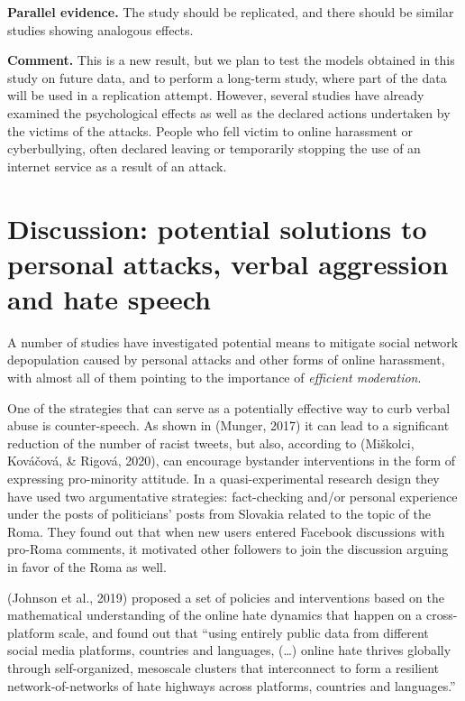 \documentclass[10pt,dvipsnames]{scrartcl}
\begin{document}
\begin{description}
\item \textbf{Parallel evidence.} The study should be replicated, and there should be similar studies showing analogous effects. 


\textbf{Comment.} This is a new result, but we plan to test the models obtained in this study on future data, and to perform a long-term study, where part of the data will be used in a replication attempt. However, several studies have already examined the psychological effects as well as the declared actions undertaken by the victims of the attacks. People who fell victim to online harassment or cyberbullying, often  declared leaving or temporarily stopping the use of an internet service as a result of an attack. 




\end{description}

\section{Discussion: potential solutions to personal attacks, verbal aggression and hate speech}
\label{discussion}

A number of studies have investigated potential means to mitigate social
network depopulation caused by personal attacks and other forms of
online harassment, with almost all of them pointing to the importance of
\textit{efficient moderation}.

One of the strategies that can serve as a potentially effective way to
curb verbal abuse is counter-speech. As shown in (Munger, 2017) it can
lead to a significant reduction of the number of racist tweets, but
also, according to (Miškolci, Kováčová, \& Rigová, 2020), can encourage
bystander interventions in the form of expressing pro-minority attitude.
In a quasi-experimental research design they have used two argumentative
strategies: fact-checking and/or personal experience under the posts of
politicians' posts from Slovakia related to the topic of the Roma. They
found out that when new users entered Facebook discussions with pro-Roma
comments, it motivated other followers to join the discussion arguing in
favor of the Roma as well.

(Johnson et al., 2019) proposed a set of policies and interventions
based on the mathematical understanding of the online hate dynamics that
happen on a cross-platform scale, and found out that ``using entirely
public data from different social media platforms, countries and
languages, (\dots) online hate thrives globally through self-organized,
mesoscale clusters that interconnect to form a resilient
network-of-networks of hate highways across platforms, countries and
languages.''
\end{document}
